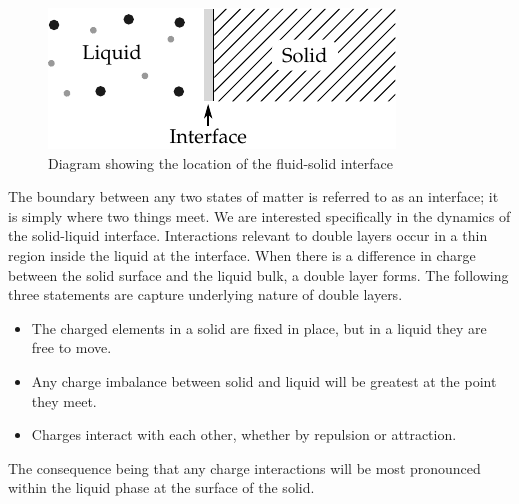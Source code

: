     \begin{figure}[h]
        \begin{center}
            \includegraphics{content/introduction/graphics/simpleLayerDiagram}
        \end{center}
        \caption{Diagram showing the location of the fluid-solid interface}
        \label{fig:interfaceDiagram}
    \end{figure}
    The boundary between any two states of matter is referred to as an interface; it is simply where two things meet.
    We are interested specifically in the dynamics of the solid-liquid interface.
    Interactions relevant to double layers occur in a thin region inside the liquid at the interface.
    When there is a difference in charge between the solid surface and the liquid bulk, a double layer forms.
    The following three statements are capture underlying nature of double layers.
    \begin{itemize}
      \item The charged elements in a solid are fixed in place, but in a liquid they are free to move.
      \item Any charge imbalance between solid and liquid will be greatest at the point they meet.
      \item Charges interact with each other, whether by repulsion or attraction.
    \end{itemize}
    The consequence being that any charge interactions will be most pronounced within the liquid phase at the surface of the solid.

